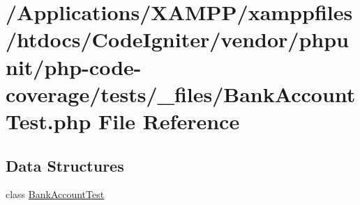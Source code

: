 \hypertarget{php-code-coverage_2tests_2__files_2_bank_account_test_8php}{}\section{/\+Applications/\+X\+A\+M\+P\+P/xamppfiles/htdocs/\+Code\+Igniter/vendor/phpunit/php-\/code-\/coverage/tests/\+\_\+files/\+Bank\+Account\+Test.php File Reference}
\label{php-code-coverage_2tests_2__files_2_bank_account_test_8php}
\subsection*{Data Structures}
\begin{DoxyCompactItemize}
\item 
class \mbox{\hyperlink{class_bank_account_test}{Bank\+Account\+Test}}
\end{DoxyCompactItemize}
